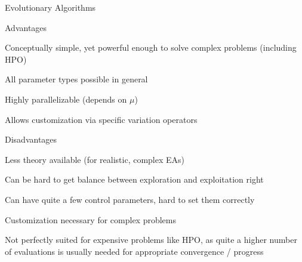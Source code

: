 \begin{frame}{Evolutionary Algorithms}

  \begin{blocki}{Advantages}
    \item Conceptually simple, yet powerful enough to solve complex problems (including HPO)
    \item All parameter types possible in general
    \item Highly parallelizable (depends on $\mu$)
    \item Allows customization via specific variation operators
    \end{blocki}

    \begin{blocki}{Disadvantages}
      \item Less theory available (for realistic, complex EAs)
    \item Can be hard to get balance between exploration and exploitation right
        \item Can have quite a few control parameters, hard to set them correctly\\
        \item Customization necessary for complex problems
        \item Not perfectly suited for expensive problems like HPO, 
            as quite a higher number of evaluations is usually
            needed for appropriate convergence / progress
    \end{blocki}

\end{frame}







